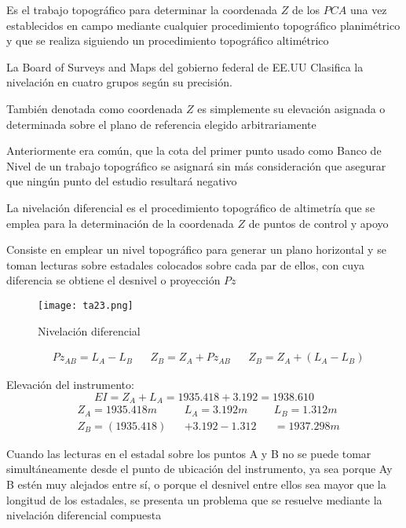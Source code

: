 \begin{definition}[Nivelación]
Es el trabajo topográfico para determinar la coordenada $Z$ de los $PCA$ una vez establecidos en campo mediante cualquier procedimiento topográfico planimétrico y que se realiza siguiendo un procedimiento topográfico altimétrico
\end{definition}

La Board of Surveys and Maps del gobierno federal de EE.UU Clasifica la nivelación en cuatro grupos según su precisión.


\begin{definition}
    También denotada como coordenada $Z$ es simplemente su elevación asignada o determinada sobre el plano de referencia elegido arbitrariamente
\end{definition}

Anteriormente era común, que la cota del primer punto usado como Banco de Nivel de un trabajo topográfico se asignará sin más consideración que asegurar que ningún punto del estudio resultará negativo

La nivelación diferencial es el procedimiento topográfico de altimetría que se emplea para la determinación de la coordenada $Z$ de puntos de control y apoyo

Consiste en emplear un nivel topográfico para generar un plano horizontal y se toman lecturas sobre estadales colocados sobre cada par de ellos, con cuya diferencia se obtiene el desnivel o proyección $Pz$

\begin{figure}[h!]
    \centerline{\texttt{[image: ta23.png]}}
    \caption{Nivelación diferencial}
    \label{ta23}
\end{figure}
\begin{align*}
    &Pz_{AB}=L_A-L_B&&Z_B=Z_A+Pz_{AB}&&Z_B=Z_A+(L_A-L_B)
\end{align*}

Elevación del instrumento: 
\begin{equation*}
    EI=Z_A+L_A=1935.418+3.192=1938.610
\end{equation*}
\begin{align*}
    &Z_A=1935.418m&&L_A=3.192m&&L_B=1.312m\\
    &Z_B=(1935.418)&&+3.192-1.312&&=1937.298m
\end{align*}

Cuando las lecturas en el estadal sobre los puntos A y B no se puede tomar simultáneamente desde el punto de ubicación del instrumento, ya sea porque Ay B estén muy alejados entre sí, o porque el desnivel entre ellos sea mayor que la longitud de los estadales, se presenta un problema que se resuelve mediante la nivelación diferencial compuesta

